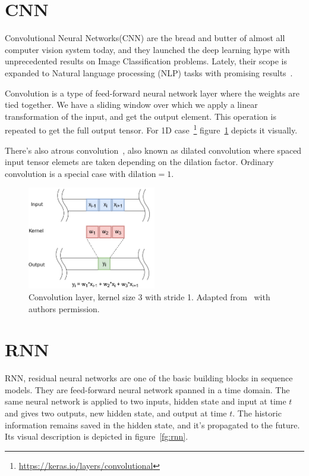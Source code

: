 \documentclass[times, utf8, diplomski, english]{fer}
\begin{document}
\section{CNN}
Convolutional Neural Networks(CNN) are the bread and butter of almost all computer vision system today, and they launched the deep learning hype with unprecedented results on Image Classification problems. 
Lately, their scope is expanded to Natural language processing (NLP) tasks with promising results~\citep{BYTENET, facebook}.

Convolution is a type of feed-forward neural network layer where the weights are tied together. We have a sliding window over which we apply a linear transformation of the input, and get the output element. This operation is repeated to get the full output tensor. For 1D case~\footnote{\url{https://keras.io/layers/convolutional}} figure~\ref{fg:convolution} depicts it visually. 

There's also atrous convolution~\cite{atrous_DBLP:journals/corr/ChenPSA17}, also known as dilated convolution where spaced input tensor elemets are taken depending on the dilation factor. Ordinary convolution is a special case with $\text{dilation} = 1$.

\begin{figure}
    \begin{center}
        \includegraphics[width=0.5\textwidth]{convolution}
        \caption{Convolution layer, kernel size 3 with stride 1. Adapted from~\citep{mratkovic} with authors permission.}
        \label{fg:convolution}
    \end{center}
\end{figure}

\section{RNN}
RNN, residual neural networks are one of the basic building blocks in sequence models. They are feed-forward neural network spanned in a time domain. The same neural network is applied to two inputs, hidden state and input at time $t$ and gives two outputs, new hidden state, and output at time $t$. The historic information remains saved in the hidden state, and it's propagated to the future. Its visual description is depicted in figure~\ref{fg:rnn}.
\end{document}
